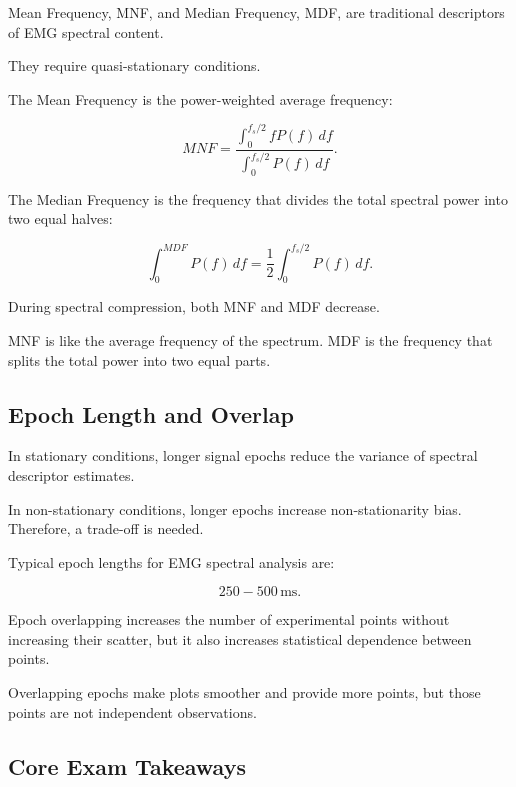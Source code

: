 Mean Frequency, MNF, and Median Frequency, MDF, are traditional descriptors of EMG spectral content.

They require quasi-stationary conditions.

The Mean Frequency is the power-weighted average frequency:

\[
MNF =
\frac{
\int_{0}^{f_s/2}
f P(f)\,df
}{
\int_{0}^{f_s/2}
P(f)\,df
}.
\]

The Median Frequency is the frequency that divides the total spectral power into two equal halves:

\[
\int_{0}^{MDF}
P(f)\,df
=
\frac{1}{2}
\int_{0}^{f_s/2}
P(f)\,df.
\]

During spectral compression, both MNF and MDF decrease.

\begin{authornote}
MNF is like the average frequency of the spectrum. MDF is the frequency that splits the total power into two equal parts.
\end{authornote}

\subsection{Epoch Length and Overlap}

In stationary conditions, longer signal epochs reduce the variance of spectral descriptor estimates.

In non-stationary conditions, longer epochs increase non-stationarity bias. Therefore, a trade-off is needed.

Typical epoch lengths for EMG spectral analysis are:

\[
250-500\,\text{ms}.
\]

Epoch overlapping increases the number of experimental points without increasing their scatter, but it also increases statistical dependence between points.

\begin{authornote}
Overlapping epochs make plots smoother and provide more points, but those points are not independent observations.
\end{authornote}

\subsection{Core Exam Takeaways}

